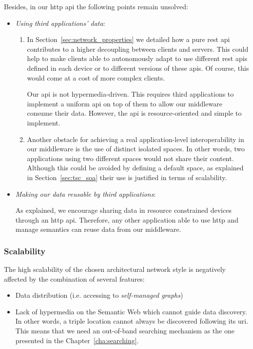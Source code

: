 Besides, in our \ac{http} \ac{api} the following points remain unsolved:
\begin{itemize} %
  \item \emph{Using third applications' data}:
  \begin{enumerate}
    \item In Section~\ref{sec:network_properties} we detailed how a pure \ac{rest} \ac{api} contributes to a higher decoupling between clients and servers.
	  This could help to make clients able to autonomously adapt to use different \ac{rest} \acp{api} defined in each device or to different versions of these \acp{api}. %
	  Of course, this would come at a cost of more complex clients. %
	  
	  Our \ac{api} is not hypermedia-driven.
	  This requires third applications to implement a uniform \ac{api} on top of them to allow our middleware consume their data.
	  However, the \ac{api} is resource-oriented and simple to implement. %
	  
    \item Another obstacle for achieving a real application-level interoperability in our middleware is the use of distinct isolated spaces.
	  In other words, two applications using two different spaces would not share their content.
	  Although this could be avoided by defining a default space, as explained in Section~\ref{sec:tsc_soa} their use is justified in terms of scalability.
  \end{enumerate}
  
  \item \emph{Making our data reusable by third applications}:
	
	As explained, we encourage sharing data in resource constrained devices through an \ac{http} \ac{api}. %
	Therefore, any other application able to use \ac{http} and manage semantics can reuse data from our middleware.
\end{itemize}


\subsubsection{Scalability}

The high scalability of the chosen architectural network style is negatively affected by the combination of several features:
\begin{itemize}
  \item Data distribution (i.e. accessing to \emph{self-managed graphs})
  \item Lack of hypermedia on the Semantic Web which cannot guide data discovery.
        In other words, a triple location cannot always be discovered following its \ac{uri}. %
        This means that we need an out-of-band searching mechanism as the one presented in the Chapter~\ref{cha:searching}.
\end{itemize}

